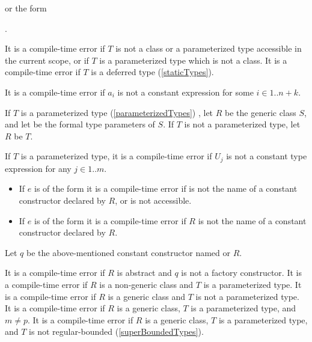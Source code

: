 \documentclass[makeidx]{article}
\begin{document}
or the form

.

\LMHash{}%
It is a compile-time error if $T$ is not
a class or a parameterized type accessible in the current scope,
or if $T$ is a parameterized type which is not a class.
It is a compile-time error if $T$ is a deferred type
(\ref{staticTypes}).

\LMHash{}%
It is a compile-time error if $a_i$ is not a constant expression
for some $i \in 1 .. n + k$.

\LMHash{}%
If $T$ is a parameterized type (\ref{parameterizedTypes})
,
let $R$ be the generic class $S$,
and let
be the formal type parameters of $S$.
If $T$ is not a parameterized type, let $R$ be $T$.

\LMHash{}%
If $T$ is a parameterized type,
it is a compile-time error if $U_j$ is not a constant type expression for any
$j \in 1 .. m$.

\begin{itemize}
\item
  If $e$ is of the form
  it is a compile-time error if  is not the name of
  a constant constructor declared by $R$, or \id{} is not accessible.
\item
  If $e$ is of the form
  it is a compile-time error if $R$ is not the name of
  a constant constructor declared by $R$.
\end{itemize}

\LMHash{}%
Let $q$ be the above-mentioned constant constructor named  or $R$.

\LMHash{}%
It is a compile-time error if $R$ is abstract
and $q$ is not a factory constructor.
It is a compile-time error if $R$ is a non-generic class
and $T$ is a parameterized type.
It is a compile-time error if $R$ is a generic class
and $T$ is not a parameterized type.
It is a compile-time error if $R$ is a generic class,
$T$ is a parameterized type, and $m \not= p$.
It is a compile-time error if $R$ is a generic class,
$T$ is a parameterized type,
and $T$ is not regular-bounded
(\ref{superBoundedTypes}).
\end{document}
